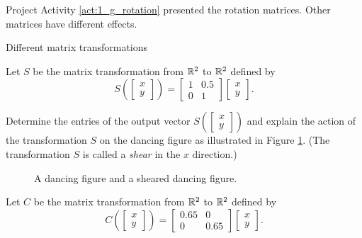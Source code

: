 Project Activity \ref{act:1_g_rotation} presented the rotation matrices. Other matrices have different effects. 

\begin{pactivity} \label{act:1_g_shear} Different matrix transformations 
\ba
\item Let $S$ be the matrix transformation from $\mathbb{R}^2$ to $\mathbb{R}^2$ defined by 
\[S\left(\left[ \begin{array}{c} x \\ y \end{array} \right] \right) = \left[ \begin{array}{cr} 1&0.5 \\ 0&1 \end{array} \right]\left[ \begin{array}{c} x \\ y \end{array} \right].\]

Determine the entries of the output vector $S\left(\left[ \begin{array}{c} x \\ y \end{array} \right] \right)$ and explain the action of the transformation $S$ on the dancing figure as illustrated in Figure \ref{F:Shear_x_Dance}. (The transformation $S$ is called a \emph{shear} in the $x$ direction.)
\begin{figure}[ht]
\begin{center}
\caption{A dancing figure and a sheared dancing figure.}
\label{F:Shear_x_Dance}
\end{center}
\end{figure}


\item Let $C$ be the matrix transformation from $\mathbb{R}^2$ to $\mathbb{R}^2$ defined by 
\[C\left(\left[ \begin{array}{c} x \\ y \end{array} \right] \right) = \left[ \begin{array}{cr} 0.65&0 \\ 0&0.65 \end{array} \right]\left[ \begin{array}{c} x \\ y \end{array} \right].\]


\end{pactivity}
